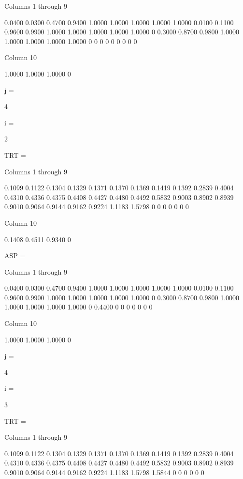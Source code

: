   Columns 1 through 9

    0.0400    0.0300    0.4700    0.9400    1.0000    1.0000    1.0000    1.0000    1.0000
    0.0100    0.1100    0.9600    0.9900    1.0000    1.0000    1.0000    1.0000    1.0000
         0    0.3000    0.8700    0.9800    1.0000    1.0000    1.0000    1.0000    1.0000
         0         0         0         0         0         0         0         0         0

  Column 10

    1.0000
    1.0000
    1.0000
         0


j =

     4


i =

     2


TRT =

  Columns 1 through 9

    0.1099    0.1122    0.1304    0.1329    0.1371    0.1370    0.1369    0.1419    0.1392
    0.2839    0.4004    0.4310    0.4336    0.4375    0.4408    0.4427    0.4480    0.4492
    0.5832    0.9003    0.8902    0.8939    0.9010    0.9064    0.9144    0.9162    0.9224
    1.1183    1.5798         0         0         0         0         0         0         0

  Column 10

    0.1408
    0.4511
    0.9340
         0


ASP =

  Columns 1 through 9

    0.0400    0.0300    0.4700    0.9400    1.0000    1.0000    1.0000    1.0000    1.0000
    0.0100    0.1100    0.9600    0.9900    1.0000    1.0000    1.0000    1.0000    1.0000
         0    0.3000    0.8700    0.9800    1.0000    1.0000    1.0000    1.0000    1.0000
         0    0.4400         0         0         0         0         0         0         0

  Column 10

    1.0000
    1.0000
    1.0000
         0


j =

     4


i =

     3


TRT =

  Columns 1 through 9

    0.1099    0.1122    0.1304    0.1329    0.1371    0.1370    0.1369    0.1419    0.1392
    0.2839    0.4004    0.4310    0.4336    0.4375    0.4408    0.4427    0.4480    0.4492
    0.5832    0.9003    0.8902    0.8939    0.9010    0.9064    0.9144    0.9162    0.9224
    1.1183    1.5798    1.5844         0         0         0         0         0         0

